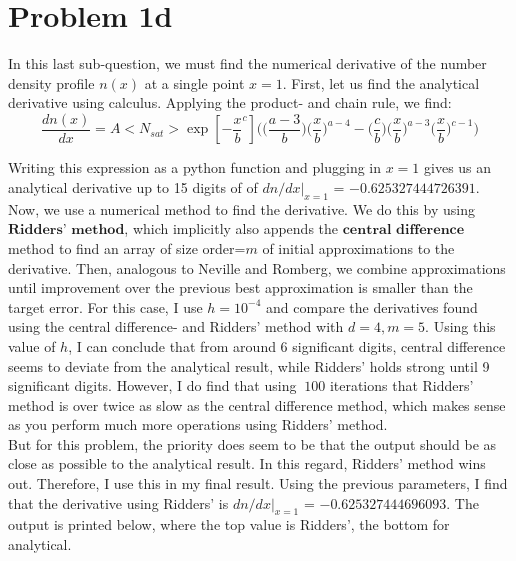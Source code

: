 
\section*{Problem 1d}

In this last sub-question, we must find the numerical derivative of the number density profile $n(x)$ at a single point $x=1$. First, let us find the analytical derivative using calculus. Applying the product- and chain rule, we find:\\

\begin{equation}
	\frac{dn(x)}{dx} = A <N_{sat}> \exp[-\frac{x}{b}^{c}]\Bigg(\Big(\frac{a-3}{b}\Big) \Big(\frac{x}{b}\Big)^{a-4} - \Big(\frac{c}{b}\Big) \Big(\frac{x}{b}\Big)^{a-3} \Big(\frac{x}{b}\Big)^{c-1}\Bigg)
\end{equation}

Writing this expression as a python function and plugging in $x=1$ gives us an analytical derivative up to 15 digits of of $dn/dx |_{x=1}$ = $-0.625327444726391$. Now, we use a numerical method to find the derivative. We do this by using $\textbf{Ridders' method}$, which implicitly also appends the $\textbf{central difference}$ method to find an array of size order=$m$ of initial approximations to the derivative. Then, analogous to Neville and Romberg, we combine approximations until improvement over the previous best approximation is smaller than the target error. For this case, I use $h = 10^{-4}$ and compare the derivatives found using the central difference- and Ridders' method with $d= 4, m=5$. Using this value of $h$, I can conclude that from around 6 significant digits, central difference seems to deviate from the analytical result, while Ridders' holds strong until 9 significant digits. However, I do find that using $~100$ iterations that Ridders' method is over twice as slow as the central difference method, which makes sense as you perform much more operations using Ridders' method.\\

But for this problem, the priority does seem to be that the output should be as close as possible to the analytical result. In this regard, Ridders' method wins out. Therefore, I use this in my final result. Using the previous parameters, I find that the derivative using Ridders' is $dn/dx |_{x=1}$ = $-0.625327444696093$. The output is printed below, where the top value is Ridders', the bottom for analytical. 

%